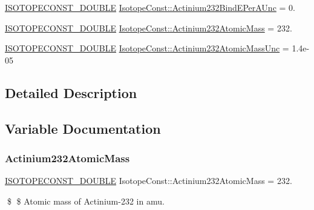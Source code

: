 \begin{DoxyCompactItemize}
\mbox{\hyperlink{group___isotope_const-_macros_ga8f45a7272ce02c0b4c65c44636ed719a}{I\+S\+O\+T\+O\+P\+E\+C\+O\+N\+S\+T\+\_\+\+D\+O\+U\+B\+LE}} \mbox{\hyperlink{group___isotope_const-_actinium-_ac232_ga2421ec76596f00f480be91c70aefa384}{Isotope\+Const\+::\+Actinium232\+Bind\+E\+Per\+A\+Unc}} = 0.
\item 
\mbox{\hyperlink{group___isotope_const-_macros_ga8f45a7272ce02c0b4c65c44636ed719a}{I\+S\+O\+T\+O\+P\+E\+C\+O\+N\+S\+T\+\_\+\+D\+O\+U\+B\+LE}} \mbox{\hyperlink{group___isotope_const-_actinium-_ac232_ga72cfffb1a8e22f2a302602f272c7948d}{Isotope\+Const\+::\+Actinium232\+Atomic\+Mass}} = 232.
\item 
\mbox{\hyperlink{group___isotope_const-_macros_ga8f45a7272ce02c0b4c65c44636ed719a}{I\+S\+O\+T\+O\+P\+E\+C\+O\+N\+S\+T\+\_\+\+D\+O\+U\+B\+LE}} \mbox{\hyperlink{group___isotope_const-_actinium-_ac232_gad6717c4c7973906445cb0153d0cd57db}{Isotope\+Const\+::\+Actinium232\+Atomic\+Mass\+Unc}} = 1.\+4e-\/05
\end{DoxyCompactItemize}


\subsection{Detailed Description}


\subsection{Variable Documentation}
\mbox{\label{group___isotope_const-_actinium-_ac232_ga72cfffb1a8e22f2a302602f272c7948d}} 
\subsubsection{\texorpdfstring{Actinium232\+Atomic\+Mass}{Actinium232AtomicMass}}
{\footnotesize\ttfamily \mbox{\hyperlink{group___isotope_const-_macros_ga8f45a7272ce02c0b4c65c44636ed719a}{I\+S\+O\+T\+O\+P\+E\+C\+O\+N\+S\+T\+\_\+\+D\+O\+U\+B\+LE}} Isotope\+Const\+::\+Actinium232\+Atomic\+Mass = 232.}

\$ \$ Atomic mass of Actinium-\/232 in amu. \mbox{\label{group___isotope_const-_actinium-_ac232_gad6717c4c7973906445cb0153d0cd57db}} 

